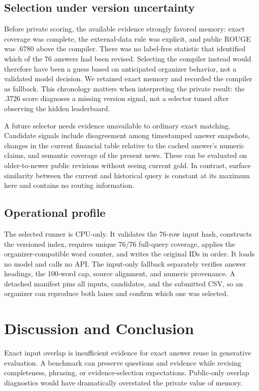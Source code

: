 \documentclass[11pt]{article}
\begin{document}
\subsection{Selection under version uncertainty}
Before private scoring, the available evidence strongly favored memory: exact
coverage was complete, the external-data rule was explicit, and public ROUGE
was .6780 above the compiler.  There was no label-free statistic that identified
which of the 76 answers had been revised.  Selecting the compiler instead would
therefore have been a guess based on anticipated organizer behavior, not a
validated model decision.  We retained exact memory and recorded the compiler
as fallback.  This chronology matters when interpreting the private result:
the .3726 score diagnoses a missing version signal, not a selector tuned after
observing the hidden leaderboard.

A future selector needs evidence unavailable to ordinary exact matching.
Candidate signals include disagreement among timestamped answer snapshots,
changes in the current financial table relative to the cached answer's numeric
claims, and semantic coverage of the present news.  These can be evaluated on
older-to-newer public revisions without seeing current gold.  In contrast,
surface similarity between the current and historical query is constant at its
maximum here and contains no routing information.

\subsection{Operational profile}
The selected runner is CPU-only.  It validates the 76-row input hash, constructs
the versioned index, requires unique 76/76 full-query coverage, applies the
organizer-compatible word counter, and writes the original IDs in order.  It
loads no model and calls no API.  The input-only fallback separately verifies
answer headings, the 100-word cap, source alignment, and numeric provenance.
A detached manifest pins all inputs, candidates, and the submitted CSV, so an
organizer can reproduce both lanes and confirm which one was selected.

\section{Discussion and Conclusion}
Exact input overlap is insufficient evidence for exact answer reuse in generative evaluation. A benchmark can preserve questions and evidence while revising completeness, phrasing, or evidence-selection expectations. Public-only overlap diagnostics would have dramatically overstated the private value of memory.
\end{document}
